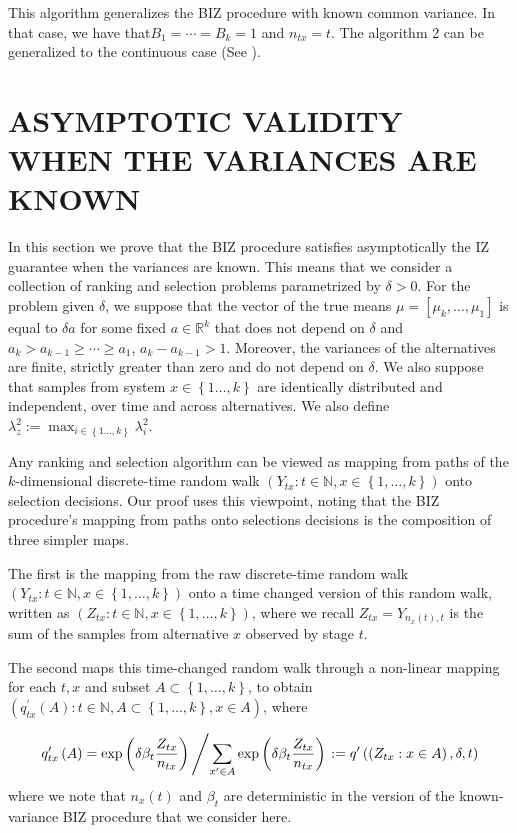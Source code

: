 \documentclass{wscpaperproc}
\theoremstyle{wsc}
\begin{document}
This algorithm generalizes the BIZ procedure with known common variance. In that case, we have that$B_1=\cdots=B_k=1$ and $n_{tx}=t$. The algorithm 2 can be generalized to the continuous case (See  ). 

\section{ASYMPTOTIC VALIDITY WHEN THE VARIANCES ARE KNOWN}

In this section we prove that the BIZ procedure satisfies asymptotically the IZ guarantee
when the variances are known. This means that we consider a collection of
ranking and selection problems parametrized by $\delta>0$.  
For the problem given $\delta$, we suppose that the vector of the true means
$\mu=\left[\mu_{k},\ldots,\mu_{1}\right]$ is equal to $\delta a$ for some fixed $a\in\mathbb{R}^{k}$ that
does not depend on $\delta$ and $a_{k}>a_{k-1}\geq \cdots \geq a_{1}$, $a_{k}-a_{k-1}>1$.
Moreover, the variances of the alternatives are finite, strictly greater than zero and do not depend on $\delta$.
We also suppose that samples from system $x\in\left\{ 1\ldots,k\right\} $ are identically distributed
and independent, over time and across alternatives. We also define
$\lambda_{z}^{2}:=\max_{i\in\left\{ 1\ldots,k\right\} }\lambda_{i}^{2}$.

Any ranking and selection algorithm can be viewed as mapping from
paths of the $k$-dimensional discrete-time random walk $\left(Y_{tx}:t\in\mathbb{N},x\in\left\{ 1,\ldots,k\right\} \right)$
onto selection decisions. 
Our proof uses this viewpoint, noting that 
the BIZ procedure's mapping from paths onto
selections decisions is the composition of three
simpler maps.

The first is the mapping from the raw discrete-time random walk $\left(Y_{tx}:t\in\mathbb{N},x\in\left\{ 1,\ldots,k\right\} \right)$
onto a time changed version of this random walk, written as $\left(Z_{tx}:t\in\mathbb{N},x\in\left\{ 1,\ldots,k\right\} \right)$,
where we recall $Z_{tx}=Y_{n_{x}\left(t\right),t}$ is the sum of
the samples from alternative $x$ observed by stage $t$.

The second maps this time-changed random walk through a non-linear
mapping for each $t,x$ and subset $A\subset\left\{ 1,\ldots,k\right\} $,
to obtain $\left(q_{tx}^{'}\left(A\right):t\in\mathbb{N},A\subset\left\{ 1,\ldots,k\right\} ,x\in A\right)$,
where

\[
q'_{tx}\left(A\right)=\mbox{exp}\left(\delta\beta_{t}\frac{Z_{tx}}{n_{tx}}\right)\left/\sum_{x'\in A}\mbox{exp}\left(\delta\beta_{t}\frac{Z_{tx}}{n_{tx}}\right)\right.:=q'\left(\left(Z_{tx}:x\in A\right),\delta,t\right)
\]
where we note that $n_{x}\left(t\right)$ and $\beta_{t}$ are deterministic
in the version of the known-variance BIZ procedure that we consider
here.
\end{document}
